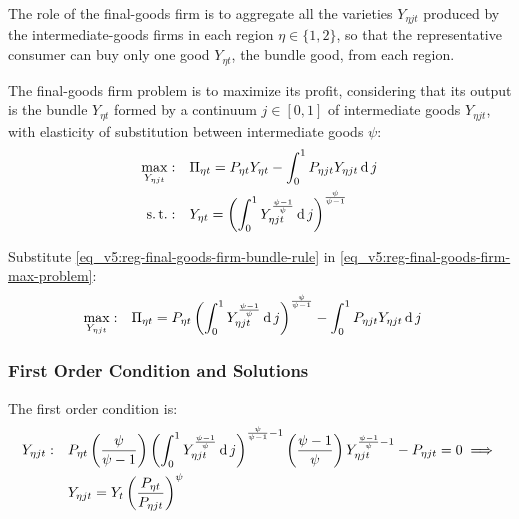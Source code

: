 \documentclass[../thesis.tex]{subfiles}
\begin{document}
The role of the final-goods firm is to aggregate all the varieties $Y_{\eta jt}$ produced by the intermediate-goods firms in each region $\eta \in \{1,2\}$, so that the representative consumer can buy only one good $Y_{\eta t}$, the bundle good, from each region.



The final-goods firm problem is to maximize its profit, considering that its output is the bundle $Y_{\eta t}$ formed by a continuum $j \in [0,1]$ of intermediate goods $Y_{\eta jt}$, with elasticity of substitution between intermediate goods $\psi$:
\begin{align}
	\max_{Y_{\eta jt}}: &\quad \Pi_{\eta t} = P_{\eta t} Y_{\eta t} - \int_{0}^{1} P_{\eta jt} Y_{\eta jt} \operatorname{d} j \label{eq_v5:reg-final-goods-firm-max-problem} \\
	\operatorname{s.t.}: & \quad Y_{\eta t} = \left( \int_{0}^{1} Y_{\eta jt}^{\frac{\psi-1}{\psi}} \operatorname{d} j \right)^{\frac{\psi}{\psi-1}} \label{eq_v5:reg-final-goods-firm-bundle-rule}
\end{align}

Substitute \ref{eq_v5:reg-final-goods-firm-bundle-rule} in \ref{eq_v5:reg-final-goods-firm-max-problem}:
\begin{align}
	\label{eq_v5:reg-final-goods-firm-max-problem-2}
	\max_{Y_{\eta jt}}: & \quad \Pi_{\eta t} = P_{\eta t} \left( \int_{0}^{1} Y_{\eta jt}^{\frac{\psi-1}{\psi}} \operatorname{d} j \right)^{\frac{\psi}{\psi-1}} - \int_{0}^{1} P_{\eta jt} Y_{\eta jt} \operatorname{d} j
\end{align}

\subsubsection*{First Order Condition and Solutions}

The first order condition is:
\begin{align}
	Y_{\eta jt}:\quad & P_{\eta t} \left( \frac{\psi}{\psi-1} \right) \left( \int_{0}^{1} Y_{\eta jt}^{\frac{\psi-1}{\psi}} \operatorname{d} j \right)^{\frac{\psi}{\psi-1}-1} \left( \frac{\psi-1}{\psi} \right) Y_{\eta jt}^{\frac{\psi-1}{\psi}-1} - P_{\eta jt} = 0 \implies \nonumber \\
	\label{eq_v5:reg-final-goods-firm-FOC}
	& Y_{\eta jt} = Y_{t} \left( \frac{P_{\eta t}}{P_{\eta jt}} \right)^{\psi}
\end{align}
\end{document}
